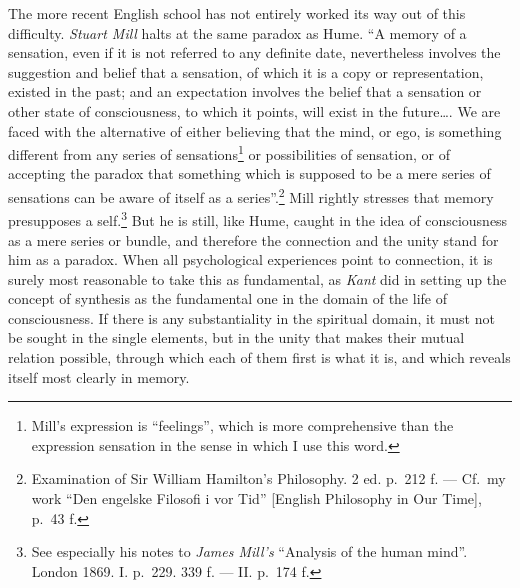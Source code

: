 \documentclass[12pt,a4paper]{book}
\newcommand{\opage}[1]{\marginnote{\footnotesize\textit{[#1]}}}
\begin{document}
The more recent English school has not entirely worked its way out of this
difficulty. \emph{Stuart Mill} halts at the same paradox as Hume. ``A
memory of a sensation, even if it is not referred to any definite date,
nevertheless involves the suggestion and belief that a sensation, of
which it is a copy or representation, existed in the past; and an
expectation involves the belief that a sensation or other state of
consciousness, to which it points, will exist in the future\ldots. We are
faced with the alternative of either believing that the mind, or ego, is
something different from any series of
sensations\footnote{Mill's expression is ``feelings'', which is more
comprehensive than the expression sensation in the sense in which I use
this word.} or possibilities of sensation, or of accepting the paradox
that something which is supposed to be a mere series of sensations can be
aware of itself
\opage{168}as a series''.\footnote{Examination of Sir William Hamilton's
Philosophy. 2 ed. p.~212 f. --- Cf.\ my work ``Den engelske Filosofi i vor
Tid'' [English Philosophy in Our Time], p.~43 f.}
Mill rightly stresses that memory presupposes a self.\footnote{See
especially his notes to \emph{James Mill's} ``Analysis of the human
mind''. London 1869. I. p.~229. 339 f. --- II. p.~174 f.} But he is still,
like Hume, caught in the idea of consciousness as a mere series or bundle,
and therefore the connection and the unity stand for him as a paradox.
When all psychological experiences point to connection, it is surely most
reasonable to take this as fundamental, as \emph{Kant} did in setting up
the concept of synthesis as the fundamental one in the domain of the life
of consciousness. If there is any substantiality in the spiritual domain,
it must not be sought in the single elements, but in the unity that makes
their mutual relation possible, through which each of them first is what
it is, and which reveals itself most clearly in memory.
\end{document}
